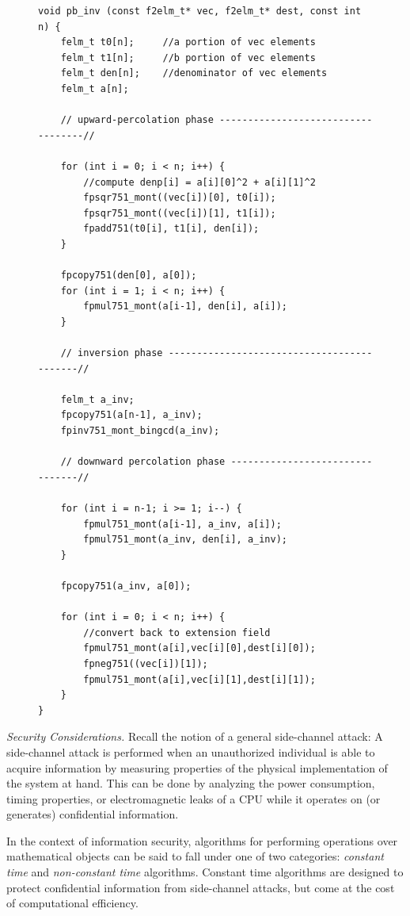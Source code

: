 \begin{figure}
\begin{lstlisting}
void pb_inv (const f2elm_t* vec, f2elm_t* dest, const int n) {
	felm_t t0[n];     //a portion of vec elements
	felm_t t1[n];     //b portion of vec elements
	felm_t den[n];    //denominator of vec elements
	felm_t a[n];

	// upward-percolation phase -----------------------------------//

	for (int i = 0; i < n; i++) {
		//compute denp[i] = a[i][0]^2 + a[i][1]^2
		fpsqr751_mont((vec[i])[0], t0[i]);
		fpsqr751_mont((vec[i])[1], t1[i]);
		fpadd751(t0[i], t1[i], den[i]);
	}	

	fpcopy751(den[0], a[0]);
	for (int i = 1; i < n; i++) {
		fpmul751_mont(a[i-1], den[i], a[i]);
	}

	// inversion phase -------------------------------------------//
	
	felm_t a_inv;
	fpcopy751(a[n-1], a_inv);
	fpinv751_mont_bingcd(a_inv);
    
	// downward percolation phase --------------------------------//

	for (int i = n-1; i >= 1; i--) {
		fpmul751_mont(a[i-1], a_inv, a[i]);
		fpmul751_mont(a_inv, den[i], a_inv);
	}

	fpcopy751(a_inv, a[0]);

	for (int i = 0; i < n; i++) {
		//convert back to extension field
		fpmul751_mont(a[i],vec[i][0],dest[i][0]);
		fpneg751((vec[i])[1]);
		fpmul751_mont(a[i],vec[i][1],dest[i][1]);
	}
}
\end{lstlisting}
\caption{}
\label{code:pbinv}
\end{figure}

\emph{Security Considerations.} Recall the notion of a general side-channel attack: A side-channel attack is performed when an unauthorized individual is able to acquire information by measuring properties of the physical implementation of the system at hand. This can be done by analyzing the power consumption, timing properties, or electromagnetic leaks of a CPU while it operates on (or generates) confidential information.

In the context of information security, algorithms for performing operations over mathematical objects can be said to fall under one of two categories: \emph{constant time} and \emph{non-constant time} algorithms. Constant time algorithms are designed to protect confidential information from side-channel attacks, but come at the cost of computational efficiency.

